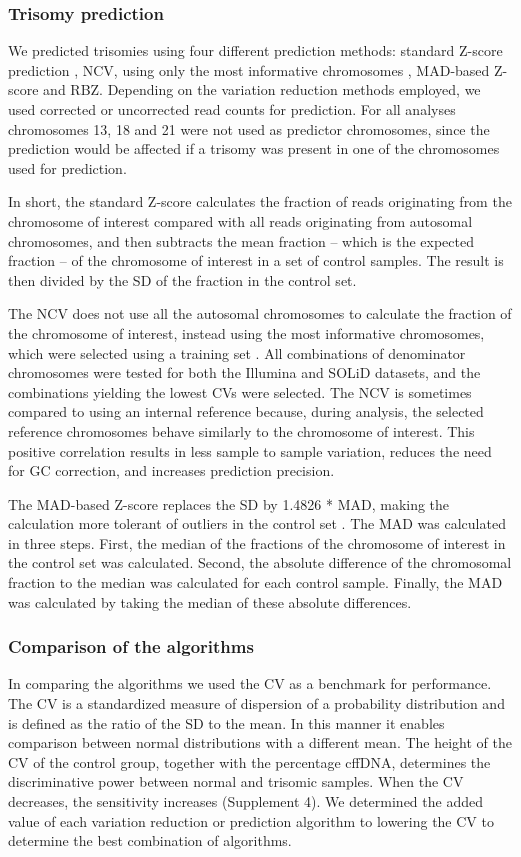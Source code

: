 \subsubsection{Trisomy prediction}
We predicted trisomies using four different prediction methods: standard Z-score prediction \cite{Chen_2011}, NCV, using only the most informative chromosomes \cite{Sehnert_2011}, MAD-based Z-score \cite{Stumm_2013} and RBZ. 
Depending on the variation reduction methods employed, we used corrected or uncorrected read counts for prediction. 
For all analyses chromosomes 13, 18 and 21 were not used as predictor chromosomes, since the prediction would be affected if a trisomy was present in one of the chromosomes used for prediction.

In short, the standard Z-score calculates the fraction of reads originating from the chromosome of interest compared with all reads originating from autosomal chromosomes, and then subtracts the mean fraction – which is the expected fraction – of the chromosome of interest in a set of control samples. 
The result is then divided by the SD of the fraction in the control set.

The NCV does not use all the autosomal chromosomes to calculate the fraction of the chromosome of interest, instead using the most informative chromosomes, which were selected using a training set \cite{Sehnert_2011}. 
All combinations of denominator chromosomes were tested for both the Illumina and SOLiD datasets, and the combinations yielding the lowest CVs were selected. 
The NCV is sometimes compared to using an internal reference \cite{Lau_2012} because, during analysis, the selected reference chromosomes behave similarly to the chromosome of interest. 
This positive correlation results in less sample to sample variation, reduces the need for GC correction, and increases prediction precision.

The MAD-based Z-score replaces the SD by 1.4826 * MAD, making the calculation more tolerant of outliers in the control set \cite{Stumm_2013}. 
The MAD was calculated in three steps. 
First, the median of the fractions of the chromosome of interest in the control set was calculated. 
Second, the absolute difference of the chromosomal fraction to the median was calculated for each control sample. 
Finally, the MAD was calculated by taking the median of these absolute differences.

\subsubsection{Comparison of the algorithms}
In comparing the algorithms we used the CV as a benchmark for performance. 
The CV is a standardized measure of dispersion of a probability distribution and is defined as the ratio of the SD to the mean. 
In this manner it enables comparison between normal distributions with a different mean. 
The height of the CV of the control group, together with the percentage cffDNA, determines the discriminative power between normal and trisomic samples. 
When the CV decreases, the sensitivity increases (Supplement 4). 
We determined the added value of each variation reduction or prediction algorithm to lowering the CV to determine the best combination of algorithms.


